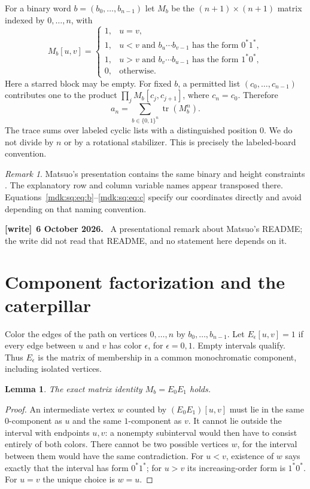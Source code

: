 \documentclass[11pt,letterpaper]{article}
\numberwithin{equation}{section}
\newtheorem{lemma}[theorem]{Lemma}
\theoremstyle{remark}\newtheorem{remark}[theorem]{Remark}
\DeclareMathOperator{\tr}{tr}\DeclareMathOperator{\TV}{TV}
\newenvironment{writenote}[1][]{\par\smallskip\begingroup\small
 \noindent\textbf{[write]}\if\relax\detokenize{#1}\relax\else~\textbf{#1.}\fi\ }%
 {\par\endgroup\smallskip}
\begin{document}
For a binary word $b=(b_0,\ldots,b_{n-1})$ let $M_b$ be the $(n+1)\times(n+1)$ matrix indexed by $0,\ldots,n$, with
\begin{equation}\label{mdk:sq:eq:M}
M_b[u,v]=\begin{cases}
1,&u=v,\\
1,&u<v\text{ and }b_u\cdots b_{v-1}\text{ has the form }0^*1^*,\\
1,&u>v\text{ and }b_v\cdots b_{u-1}\text{ has the form }1^*0^*,\\
0,&\text{otherwise}.
\end{cases}
\end{equation}
Here a starred block may be empty. For fixed $b$, a permitted list $(c_0,\ldots,c_{n-1})$ contributes one to the product $\prod_jM_b[c_j,c_{j+1}]$, where $c_n=c_0$. Therefore
\begin{equation}\label{mdk:sq:eq:transfer}
a_n=\sum_{b\in\{0,1\}^n}\tr(M_b^n).
\end{equation}
The trace sums over labeled cyclic lists with a distinguished position $0$. We do not divide by $n$ or by a rotational stabilizer. This is precisely the labeled-board convention.

\begin{remark}
Matsuo's presentation contains the same binary and height constraints \cite{matsuo}. The explanatory row and column variable names appear transposed there. Equations~\eqref{mdk:sq:eq:b}--\eqref{mdk:sq:eq:c} specify our coordinates directly and avoid depending on that naming convention.
\end{remark}
\begin{writenote}[6 October 2026]
A presentational remark about Matsuo's README; the write did not read that README, and no statement here depends on it.
\end{writenote}

\section{Component factorization and the caterpillar}\label{mdk:sq:sec:tree}
Color the edges of the path on vertices $0,\ldots,n$ by $b_0,\ldots,b_{n-1}$. Let $E_\epsilon[u,v]=1$ if every edge between $u$ and $v$ has color $\epsilon$, for $\epsilon=0,1$. Empty intervals qualify. Thus $E_\epsilon$ is the matrix of membership in a common monochromatic component, including isolated vertices.

\begin{lemma}\label{mdk:sq:lem:factor}
The exact matrix identity $M_b=E_0E_1$ holds.
\end{lemma}
\begin{proof}
An intermediate vertex $w$ counted by $(E_0E_1)[u,v]$ must lie in the same $0$-component as $u$ and the same $1$-component as $v$. It cannot lie outside the interval with endpoints $u,v$: a nonempty subinterval would then have to consist entirely of both colors. There cannot be two possible vertices $w$, for the interval between them would have the same contradiction. For $u<v$, existence of $w$ says exactly that the interval has form $0^*1^*$; for $u>v$ its increasing-order form is $1^*0^*$. For $u=v$ the unique choice is $w=u$.
\end{proof}
\end{document}
